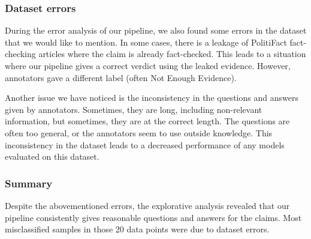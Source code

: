 \subsubsection{Dataset errors}
During the error analysis of our pipeline, we also found some errors in the \averitec{} dataset that we would like to mention. In some cases, there is a leakage of PolitiFact fact-checking articles where the claim is already fact-checked. This leads to a situation where our pipeline gives a correct verdict using the leaked evidence. However, annotators gave a different label (often Not Enough Evidence). 

Another issue we have noticed is the inconsistency in the questions and answers given by annotators. Sometimes, they are long, including non-relevant information, but sometimes, they are at the correct length. The questions are often too general, or the annotators seem to use outside knowledge. This inconsistency in the dataset leads to a decreased performance of any models evaluated on this dataset.

\subsubsection{Summary}
Despite the abovementioned errors, the explorative analysis revealed that our pipeline consistently gives reasonable questions and answers for the claims. Most misclassified samples in those 20 data points were due to dataset errors.

